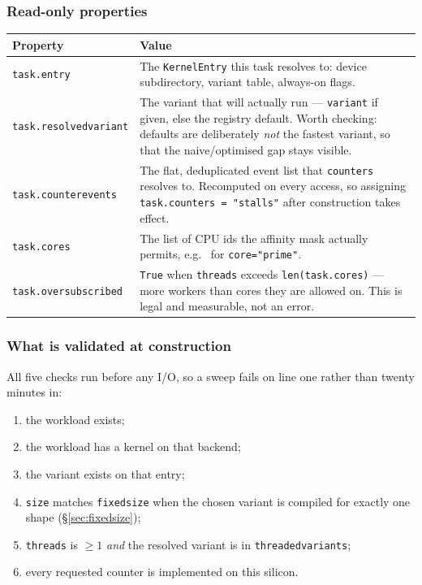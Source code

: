 \documentclass[11pt,a4paper]{article}
\newcommand{\code}[1]{\texttt{\let\_\breakableunderscore #1}}
\newcommand{\breakableunderscore}{\textunderscore\allowbreak}
\begin{document}
\subsubsection*{Read-only properties}

\begin{longtable}{@{}p{3.4cm}p{11.4cm}@{}}
\toprule
\textbf{Property} & \textbf{Value} \\
\midrule
\endhead
\code{task.entry} & The \code{KernelEntry} this task resolves to: device
  subdirectory, variant table, always-on flags. \\
\code{task.resolved\_variant} & The variant that will actually run ---
  \code{variant} if given, else the registry default. Worth checking: defaults
  are deliberately \emph{not} the fastest variant, so that the naive/optimised
  gap stays visible. \\
\code{task.counter\_events} & The flat, deduplicated event list that
  \code{counters} resolves to. Recomputed on every access, so assigning
  \code{task.counters = "stalls"} after construction takes effect. \\
\code{task.cores} & The list of CPU ids the affinity mask actually permits,
  e.g.\ \code{[6, 7]} for \code{core="prime"}. \\
\code{task.oversubscribed} & \code{True} when \code{threads} exceeds
  \code{len(task.cores)} --- more workers than cores they are allowed on. This
  is legal and measurable, not an error. \\
\bottomrule
\end{longtable}

\subsubsection*{What is validated at construction}

All five checks run before any I/O, so a sweep fails on line one rather than
twenty minutes in:

\begin{enumerate}[leftmargin=0.8cm]
  \item the workload exists;
  \item the workload has a kernel on that backend;
  \item the variant exists on that entry;
  \item \code{size} matches \code{fixed\_size} when the chosen variant is
    compiled for exactly one shape (\S\ref{sec:fixedsize});
  \item \code{threads} is $\geq 1$ \emph{and} the resolved variant is in
    \code{threaded\_variants};
  \item every requested counter is implemented on this silicon.
\end{enumerate}
\end{document}
